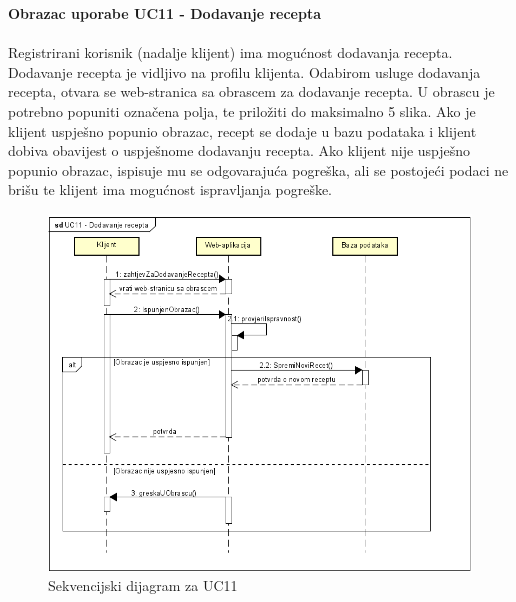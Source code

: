 \noindent\textbf{Obrazac uporabe UC11 - Dodavanje recepta}\\\\
Registrirani korisnik (nadalje klijent) ima mogućnost dodavanja recepta.
Dodavanje recepta je vidljivo na profilu klijenta.
Odabirom usluge dodavanja recepta, otvara se web-stranica sa obrascem za dodavanje recepta.
U obrascu je potrebno popuniti označena polja, te priložiti do maksimalno 5 slika.
Ako je klijent uspješno popunio obrazac, recept se dodaje u bazu podataka i klijent dobiva obavijest o uspješnome dodavanju recepta.
Ako klijent nije uspješno popunio obrazac, ispisuje mu se odgovarajuća pogreška, ali se postojeći podaci ne brišu te klijent ima mogućnost ispravljanja pogreške.
\begin{figure}[H]
	\includegraphics[scale=0.8]{slike/Slika9.png} %
	\centering
	\caption{Sekvencijski dijagram za UC11}
	\label{fig:promjene}
\end{figure}
\pagebreak

